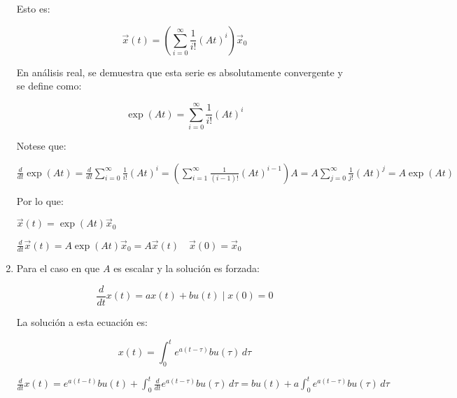 \begin{enumerate}
        Esto es:

        \begin{equation}
            \vec{x}(t) = \left( \sum\limits_{i = 0}^{\infty} \frac{1}{i!} (A t)^i \right) \vec{x}_0 \nonumber
        \end{equation}

        En análisis real, se demuestra que esta serie es absolutamente convergente y se define como:

        \begin{equation}
            \exp{(At)} = \sum\limits_{i = 0}^{\infty} \frac{1}{i!} (A t)^i
        \end{equation}

        Notese que:

        \begin{math}
            \frac{d}{dt} \exp{(At)} = \frac{d}{dt} \sum\limits_{i=0}^{\infty} \frac{1}{i!} (At)^i = \left( \sum\limits_{i=1}^{\infty} \frac{1}{(i-1)!} (At)^{i-1} \right) A = A \sum\limits_{j=0}^{\infty} \frac{1}{j!} (At)^j = A \exp{(At)}
        \end{math}

        Por lo que:

        \begin{math}
            \vec{x}(t) = \exp{(At)} \vec{x}_0
        \end{math}

        \begin{math}
            \frac{d}{dt} \vec{x}(t) = A \exp{(At)} \vec{x}_0 = A \vec{x}(t) \quad \vec{x}(0) = \vec{x}_0
        \end{math}

    \item Para el caso en que $A$ es escalar y la solución es forzada:

        \begin{equation}
            \frac{d}{dt} x(t) = a x(t) + b u(t) \mid x(0) = 0
        \end{equation}

        La solución a esta ecuación es:

        \begin{equation}
            x(t) = \int_0^t e^{a(t-\tau)} b u(\tau) \, d \tau
        \end{equation}

        \begin{math}
            \frac{d}{dt} x(t) = e^{a(t-t)} b u(t) + \int_0^t \frac{d}{dt} e^{a(t-\tau)} b u(\tau) \, d \tau = b u(t) + a \int_0^t e^{a(t-\tau)} b u(\tau) \, d \tau
        \end{math}


\end{enumerate}

